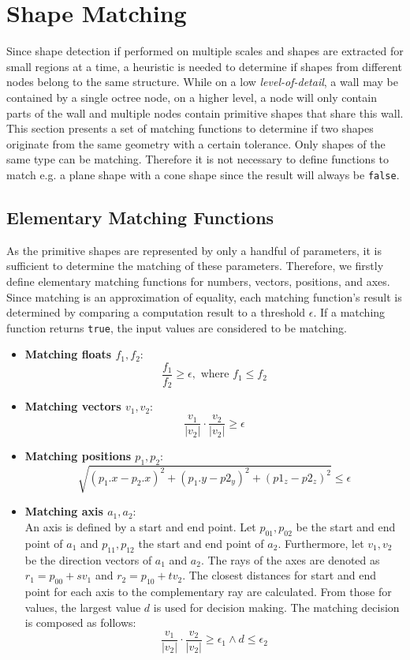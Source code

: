 \section{Shape Matching}
\label{sec:shapeMatching}

Since shape detection if performed on multiple scales and shapes are extracted for small regions at a time, a heuristic is needed to determine if shapes from different nodes belong to the same structure. While on a low \textit{level-of-detail}, a wall may be contained by a single octree node, on a higher level, a node will only contain parts of the wall and multiple nodes contain primitive shapes that share this wall. This section presents a set of matching functions to determine if two shapes originate from the same geometry with a certain tolerance. Only shapes of the same type can be matching. Therefore it is not necessary to define functions to match e.g. a plane shape with a cone shape since the result will always be \verb|false|. 


\subsection{Elementary Matching Functions}
\label{sec:elementarMatchingFuns}

As the primitive shapes are represented by only a handful of parameters, it is sufficient to determine the matching of these parameters. Therefore, we firstly define elementary matching functions for numbers, vectors, positions, and axes. Since matching is an approximation of equality, each matching function's result is determined by comparing a computation result to a threshold $\epsilon$. If a matching function returns \verb|true|, the input values are considered to be matching. 

\begin{itemize}
    \item \textbf{Matching floats $f_1, f_2$}: 
        $$\frac{f_1}{f_2} \geq \epsilon, \textrm{ where } f_1 \leq f_2$$  
    \item \textbf{Matching vectors $v_1, v_2$}: 
        $$\frac{v_1}{|v_2|} \cdot \frac{v_2}{|v_2|} \geq \epsilon$$
    \item \textbf{Matching positions $p_1, p_2$}: 
        $$\sqrt{(p_1.x - p_2.x)^2 + (p_1.y - p2_y)^2 + (p1_z - p2_z)^2} \leq \epsilon$$
    \item \textbf{Matching axis $a_1, a_2$}: 
    \\
    An axis is defined by a start and end point. Let $p_{01},p_{02}$ be the start and end point of $a_1$ and $p_{11}, p_{12}$ the start and end point of $a_2$. Furthermore, let $v_1, v_2$ be the direction vectors of $a_1$ and $a_2$. The rays of the axes are denoted as $r_1 = p_{00} + sv_1$ and $r_2 = p_{10} + tv_2$. The closest distances for start and end point for each axis to the complementary ray are calculated. From those for values, the largest value $d$ is used for decision making. The matching decision is composed as follows: 
        $$\frac{v_1}{|v_2|} \cdot \frac{v_2}{|v_2|} \geq \epsilon_1 \land d \leq \epsilon_2$$
\end{itemize}



